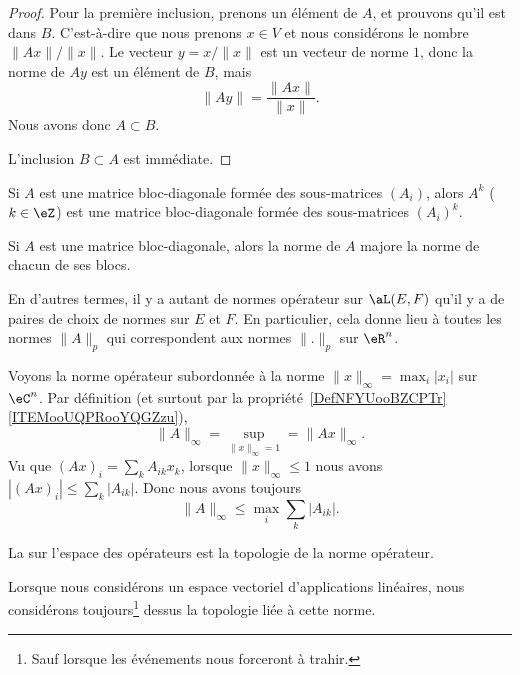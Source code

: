 \begin{proof}
    Pour la première inclusion, prenons un élément de \( A\), et prouvons qu'il est dans \( B\). C'est-à-dire que nous prenons \( x\in V\) et nous considérons le nombre \( \| Ax \|/\| x \|\). Le vecteur \( y=x/\| x \|\) est un vecteur de norme $1$, donc la norme de \( Ay\) est un élément de \( B\), mais
    \begin{equation}
        \| Ay \|=\frac{ \| Ax \| }{ \| x \| }.
    \end{equation}
    Nous avons donc \( A\subset B\).

    L'inclusion \( B\subset A\) est immédiate.
\end{proof}

\begin{lemma}       \label{LEMooHGCKooBzfAtg}
    Si \( A\) est une matrice bloc-diagonale formée des sous-matrices \( (A_i)\), alors \( A^k\) (\( k\in \eZ\)) est une matrice bloc-diagonale formée des sous-matrices \( (A_i)^k\).
\end{lemma}

\begin{proposition}      \label{PROPooJUYCooHnlFef}
    Si \( A\) est une matrice bloc-diagonale, alors la norme de \( A\) majore la norme de chacun de ses blocs.
\end{proposition}

En d'autres termes, il y a autant de normes opérateur sur \( \aL(E,F)\) qu'il y a de paires de choix de normes sur \( E\) et \( F\). En particulier, cela donne lieu à toutes les normes \( \| A \|_p\) qui correspondent aux normes \( \| . \|_p\) sur \( \eR^n\).

\begin{example}     \label{EXooXPXAooYyBwMX}
    Voyons la norme opérateur subordonnée à la norme \( \| x \|_{\infty}=\max_i| x_i |\) sur \( \eC^n\). Par définition (et surtout par la propriété~\ref{DefNFYUooBZCPTr}\ref{ITEMooUQPRooYQGZzu}),
    \begin{equation}
        \| A \|_{\infty}=\sup_{\| x \|_{\infty}=1}=\| Ax \|_{\infty}.
    \end{equation}
    Vu que \( (Ax)_i=\sum_kA_{ik}x_k\), lorsque \( \| x \|_{\infty}\leq 1\) nous avons \( | (Ax)_i |\leq \sum_k| A_{ik} |\). Donc nous avons toujours
    \begin{equation}        \label{EQooPLCIooVghasD}
        \| A \|_{\infty}\leq \max_i\sum_{k}| A_{ik} |.
    \end{equation}
\end{example}

\begin{definition}
    La  sur l'espace des opérateurs est la topologie de la norme opérateur.
\end{definition}
Lorsque nous considérons un espace vectoriel d'applications linéaires, nous considérons toujours\footnote{Sauf lorsque les événements nous forceront à trahir.} dessus la topologie liée à cette norme.

